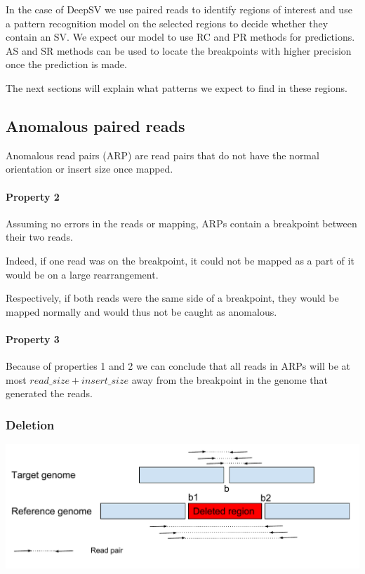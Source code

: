 \documentclass{article}
\begin{document}
In the case of DeepSV we use paired reads to identify regions of interest and use a pattern recognition model on the selected regions to decide whether they contain an SV.
We expect our model to use RC and PR methods for predictions. AS and SR methods can be used to locate the breakpoints with higher precision once the prediction is made.

The next sections will explain what patterns we expect to find in these regions.

\subsection{Anomalous paired reads}

Anomalous read pairs (ARP) are read pairs that do not have the normal orientation or insert size once mapped.

\paragraph{Property 2}  Assuming no errors in the reads or mapping, ARPs contain a breakpoint between their two reads.

Indeed, if one read was on the breakpoint, it could not be mapped as a part of it would be on a large rearrangement.

Respectively, if both reads were the same side of a  breakpoint, they would be mapped normally and would
thus not be caught as anomalous.

\paragraph{Property 3} Because of properties 1 and 2 we can conclude that all reads in ARPs will be at most $read\_size + insert\_size$ away from the breakpoint in the genome that generated the reads.

\subsubsection{Deletion}

\includegraphics[width=\textwidth]{DeletionReadPairs}
\end{document}
